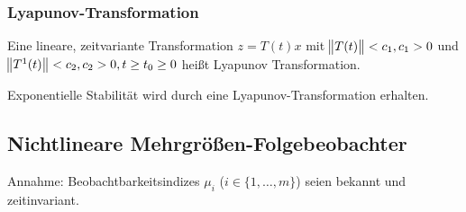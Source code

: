 \subsubsection{Lyapunov-Transformation}
Eine lineare, zeitvariante Transformation $z=T(t) x$ mit $\norm{T(t)} < c_1, c_1 > 0$ und
$\norm{T^1(t)} < c_2, c_2 > 0, t \geq t_0 \geq 0$ heißt Lyapunov Transformation.

Exponentielle Stabilität wird durch eine Lyapunov-Transformation erhalten.

\subsection{Nichtlineare Mehrgrößen-Folgebeobachter}
Annahme: Beobachtbarkeitsindizes $\mu_i$ ($i \in \{1, \ldots, m\}$) seien bekannt
und zeitinvariant.

